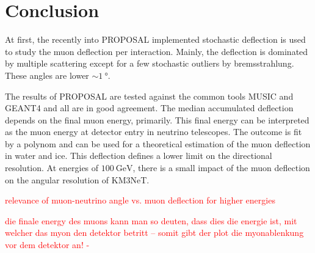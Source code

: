 \section{Conclusion}\label{sec:conclusion}

At first, the recently into PROPOSAL implemented stochastic deflection is 
used to study the muon deflection per interaction. Mainly, the deflection 
is dominated by multiple scattering except for a few stochastic 
outliers by bremsstrahlung. These angles are lower $\sim\SI{1}{\degree}$. 

The results of PROPOSAL are tested against the common tools MUSIC and 
GEANT4 and all are in good agreement.
The median accumulated deflection depends on the final muon energy, primarily. 
This final energy can be interpreted as the muon energy at detector entry 
in neutrino telescopes. 
The outcome is fit by a polynom and can be used for 
a theoretical estimation of the muon deflection in water and ice.
This deflection defines a lower limit on the directional resolution.
At energies of $\SI{100}{\giga\electronvolt}$, there is a small impact of the muon deflection on the angular 
resolution of KM3NeT.

\textcolor{red}{relevance of muon-neutrino angle vs. muon deflection for higher energies}

\textcolor{red}{die finale energy des muons kann man so deuten, dass dies die energie ist, mit welcher das myon den detektor betritt -- somit gibt der plot die myonablenkung vor dem detektor an! -}

